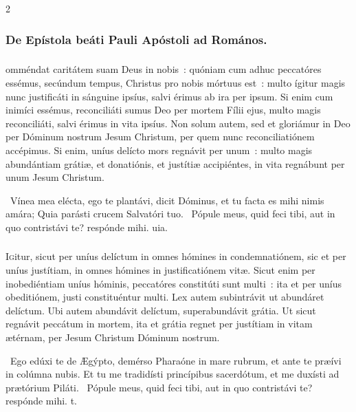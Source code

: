\documentclass[9pt,twoside]{extarticle}
\begin{document}
\begin{multicols}{2}
{{{\subsubsection*{\center De Epístola beáti Pauli Apóstoli ad Romános.}
\subsubsection*{\center {}}
omméndat caritátem suam Deus in nobis~: quóniam cum adhuc peccatóres essémus, secúndum tempus, Christus pro nobis mórtuus est~: multo ígitur magis nunc justificáti in sánguine ipsíus, salvi érimus ab ira per ipsum. Si enim cum inimíci essémus, reconciliáti sumus Deo per mortem Fílii ejus, multo magis reconciliáti, salvi érimus in vita ipsíus. Non solum autem, sed et gloriámur in Deo per Dóminum nostrum Jesum Christum, per quem nunc reconciliatiónem accépimus. Si enim, uníus delícto mors regnávit per unum~: multo magis abundántiam grátiæ, et donatiónis, et justítiæ accipiéntes, in vita regnábunt per unum Jesum Christum.

\begin{tightlist}{}
\item {}~Vínea mea elécta, ego te plantávi, dicit Dóminus, et tu facta es mihi nimis amára; \textred{*} Quia parásti crucem Salvatóri tuo. ~Pópule meus, quid feci tibi, aut in quo contristávi te? respónde mihi. uia.
\end{tightlist}

\subsubsection*{\center{}}
\lettrine{I}gitur, sicut per uníus delíctum in omnes hómines in condemnatiónem, sic et per uníus justítiam, in omnes hómines in justificatiónem vitæ. Sicut enim per inobediéntiam uníus hóminis, peccatóres constitúti sunt multi~: ita et per uníus obeditiónem, justi constituéntur multi. Lex autem subintrávit ut abundáret delíctum. Ubi autem abundávit delíctum, superabundávit grátia. Ut sicut regnávit peccátum in mortem, ita et grátia regnet per justítiam in vitam ætérnam, per Jesum Christum Dóminum nostrum.

\begin{tightlist}{}
\item {}~Ego edúxi te de Ægýpto, demérso Pharaóne in mare rubrum, et ante te præívi in colúmna nubis. \textred{*} Et tu me tradidísti princípibus sacerdótum, et me duxísti ad prætórium Piláti. ~Pópule meus, quid feci tibi, aut in quo contristávi te? respónde mihi. t.
\end{tightlist}

}}}
\end{multicols}
\end{document}

